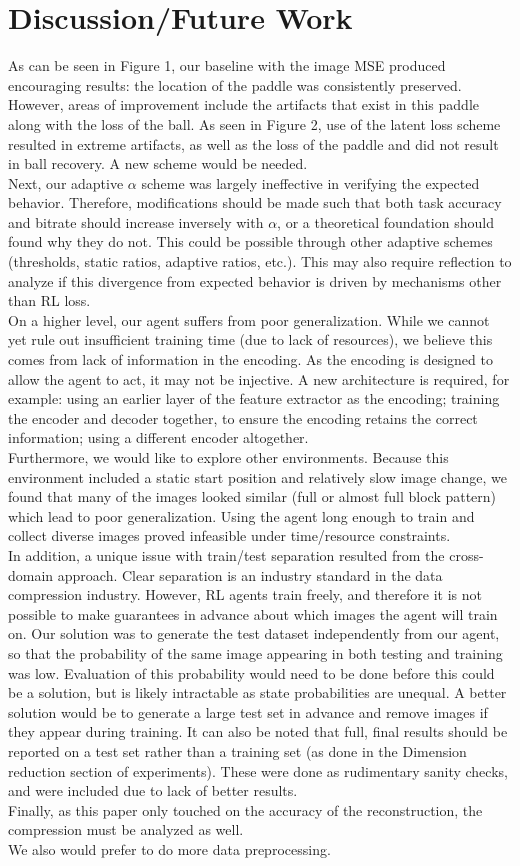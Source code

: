 \section{Discussion/Future Work}
As can be seen in Figure 1, our baseline with the image MSE produced encouraging results: the location of the paddle was consistently preserved. However, areas of improvement include the artifacts that exist in this paddle along with the loss of the ball. As seen in Figure 2, use of the latent loss scheme resulted in extreme artifacts, as well as the loss of the paddle and did not result in ball recovery. A new scheme would be needed.\\
Next, our adaptive $\alpha$ scheme was largely ineffective in verifying the expected behavior. Therefore, modifications should be made such that both task accuracy and bitrate should increase inversely with $\alpha$, or a theoretical foundation should found why they do not. This could be possible through other adaptive schemes (thresholds, static ratios, adaptive ratios, etc.). This may also require reflection to analyze if this divergence from expected behavior is driven by mechanisms other than RL loss. \\
On a higher level, our agent suffers from poor generalization. While we cannot yet rule out insufficient training time (due to lack of resources), we believe this comes from lack of information in the encoding. As the encoding is designed to allow the agent to act, it may not be injective. A new architecture is required, for example: using an earlier layer of the feature extractor as the encoding; training the encoder and decoder together, to ensure the encoding retains the correct information; using a different encoder altogether.\\
Furthermore, we would like to explore other environments. Because this environment included a static start position and relatively slow image change, we found that many of the images looked similar (full or almost full block pattern) which lead to poor generalization. Using the agent long enough to train and collect diverse images proved infeasible under time/resource constraints.\\
In addition, a unique issue with train/test separation resulted from the cross-domain approach. Clear separation is an industry standard in the data compression industry. However, RL agents train freely, and therefore it is not possible to make guarantees in advance about which images the agent will train on. Our solution was to generate the test dataset independently from our agent, so that the probability of the same image appearing in both testing and training was low. Evaluation of this probability would need to be done before this could be a solution, but is likely intractable as state probabilities are unequal. A better solution would be to generate a large test set in advance and remove images if they appear during training. It can also be noted that full, final results should be reported on a test set rather than a training set (as done in the Dimension reduction section of experiments). These were done as rudimentary sanity checks, and were included due to lack of better results.\\
Finally, as this paper only touched on the accuracy of the reconstruction, the compression must be analyzed as well.
\\
We also would prefer to do more data preprocessing.
